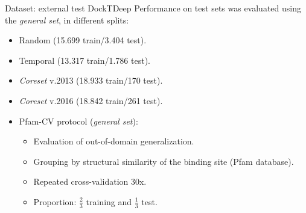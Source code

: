 \documentclass[aspectratio=169,xcolor=dvipsnames]{beamer}
\begin{document}
\begin{frame}{Dataset: external test \hfill {\footnotesize \alert{DockTDeep}}}
    Performance on test sets was evaluated using the \textit{general set}, in different splits:
    \begin{itemize}
        \item Random (15.699 train/3.404 test).
        \item Temporal (13.317 train/1.786 test).
        \item \textit{Coreset} v.2013 (18.933 train/170 test).
        \item \textit{Coreset} v.2016  (18.842 train/261 test).
              \vspace{1 em}
        \item Pfam-CV protocol (\textit{general set}):
              \begin{itemize}
                  \item Evaluation of out-of-domain generalization.
                  \item Grouping by structural similarity of the binding site (Pfam database).
                  \item Repeated cross-validation 30x.
                  \item Proportion: $\frac{2}{3}$ training and $\frac{1}{3}$ test.
              \end{itemize}
    \end{itemize}

\end{frame}
\end{document}
